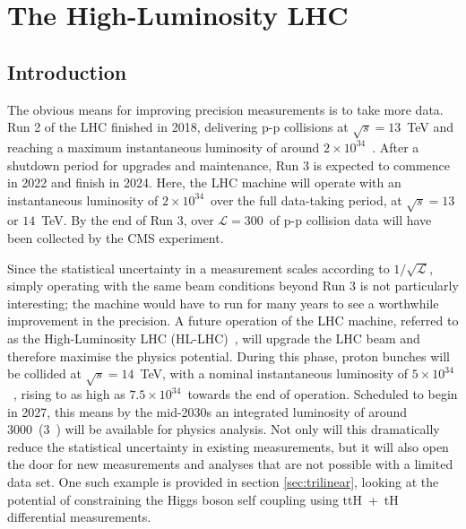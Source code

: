 \chapter{The High-Luminosity LHC}
\label{chap:hllhc}

\section{Introduction}
The obvious means for improving precision measurements is to take more data. Run 2 of the LHC finished in 2018, delivering p-p collisions at $\sqrt{s}=13$~TeV and reaching a maximum instantaneous luminosity of around $2\times10^{34}$~\lumi. After a shutdown period for upgrades and maintenance, Run 3 is expected to commence in 2022 and finish in 2024. Here, the LHC machine will operate with an instantaneous luminosity of $2\times10^{34}$~\lumi over the full data-taking period, at $\sqrt{s}=13$ or $14$~TeV. By the end of Run 3, over $\mathcal{L}=300$~\fbinv of p-p collision data will have been collected by the CMS experiment.

Since the statistical uncertainty in a measurement scales according to $1/\sqrt{\mathcal{L}}$, simply operating with the same beam conditions beyond Run 3 is not particularly interesting; the machine would have to run for many years to see a worthwhile improvement in the precision. A future operation of the LHC machine, referred to as the High-Luminosity LHC (HL-LHC)~\cite{ApollinariG.:2017ojx}, will upgrade the LHC beam and therefore maximise the physics potential. During this phase, proton bunches will be collided at $\sqrt{s}=14$~TeV, with a nominal instantaneous luminosity of $5\times10^{34}$~\lumi, rising to as high as $7.5\times10^{34}$~\lumi towards the end of operation. Scheduled to begin in 2027, this means by the mid-2030s an integrated luminosity of around 3000~\fbinv (3~\abinv) will be available for physics analysis. Not only will this dramatically reduce the statistical uncertainty in existing measurements, but it will also open the door for new measurements and analyses that are not possible with a limited data set. One such example is provided in section \ref{sec:trilinear}, looking at the potential of constraining the Higgs boson self coupling using ttH~+~tH differential measurements.

